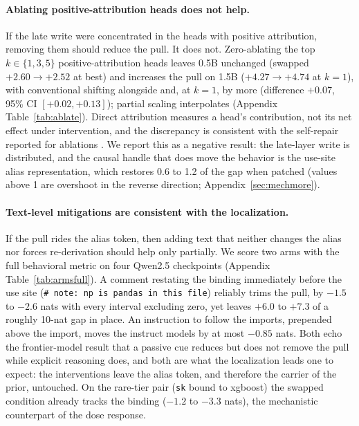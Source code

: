 \documentclass[11pt]{article}
\begin{document}
\paragraph{Ablating positive-attribution heads does not help.} If the late write were concentrated in the heads with positive attribution, removing them should reduce the pull. It does not. Zero-ablating the top $k \in \{1,3,5\}$ positive-attribution heads leaves 0.5B unchanged (swapped $+2.60 \to +2.52$ at best) and increases the pull on 1.5B ($+4.27 \to +4.74$ at $k{=}1$), with conventional shifting alongside and, at $k{=}1$, by more (difference $+0.07$, 95\% CI $[+0.02, +0.13]$); partial scaling interpolates (Appendix Table~\ref{tab:ablate}). Direct attribution measures a head's contribution, not its net effect under intervention, and the discrepancy is consistent with the self-repair reported for ablations \citep{mcgrath2023hydra,rushing2024explorations}. We report this as a negative result: the late-layer write is distributed, and the causal handle that does move the behavior is the use-site alias representation, which restores 0.6 to 1.2 of the gap when patched (values above 1 are overshoot in the reverse direction; Appendix~\ref{sec:mechmore}).

\paragraph{Text-level mitigations are consistent with the localization.} If the pull rides the alias token, then adding text that neither changes the alias nor forces re-derivation should help only partially. We score two arms with the full behavioral metric on four Qwen2.5 checkpoints (Appendix Table~\ref{tab:armsfull}). A comment restating the binding immediately before the use site (\texttt{\# note: np is pandas in this file}) reliably trims the pull, by $-1.5$ to $-2.6$ nats with every interval excluding zero, yet leaves $+6.0$ to $+7.3$ of a roughly 10-nat gap in place. An instruction to follow the imports, prepended above the import, moves the instruct models by at most $-0.85$ nats. Both echo the frontier-model result that a passive cue reduces but does not remove the pull while explicit reasoning does, and both are what the localization leads one to expect: the interventions leave the alias token, and therefore the carrier of the prior, untouched. On the rare-tier pair (\texttt{sk} bound to xgboost) the swapped condition already tracks the binding ($-1.2$ to $-3.3$ nats), the mechanistic counterpart of the dose response.
\end{document}
